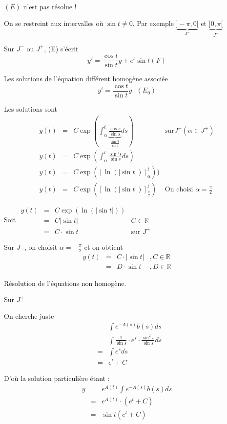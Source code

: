 $(E)$ n'est pas résolue !

On se restreint aux intervalles où $\sin t \neq 0$. Par exemple $\underbrace{]-\pi, 0[}_{J^-}$ et $\underbrace{]0, \pi[}_{J^+}$

Sur $J^-$ ou $J^+$, (E) s'écrit \[y' = \frac{\cos t}{\sin t}y + e^t \sin t (F)\]

Les solutions de l'équation différent homogène associée \[y' = \frac{\cos t}{\sin t} y \text{ } (E_0)\]

Les solutions sont \[\begin{array}{rclr}
y(t) &=& C \exp(\int^t_\alpha \underbrace{\frac{\cos s}{\sin s}}_{\frac{\sin't}{\sin t}}ds) &\text{sur} J^+ (\alpha \in J^+) \\
y(t) &=& C \exp(\int^t_\alpha \frac{\sin's}{\sin s}ds) \\ 
y(t) &=& C \exp([\ln(|\sin t|)]^t_\alpha)) \\ 
y(t) &=& C \exp([\ln(|\sin t|)]^t_{\frac{\pi}{2}}) & \text{On choisi } \alpha = \frac{\pi}{2}
\end{array}\]

Soit $\begin{array}{rclr}y(t) &=& C\exp(\ln(|\sin t|)) \\
&=& C|\sin t| & C \in \mathbb{R}\\
&=& C\cdot \sin t & \text{sur } J^+\end{array}$

Sur $J^-$, on choisit $\alpha = -\frac{\pi}{2}$ et on obtient \[\begin{array}{rclr}
y(t) &=& C\cdot |\sin t|&, C \in \mathbb{R} \\
&=& D \cdot \sin t&, D \in \mathbb{R}\end{array}\]

Résolution de l'équations non homogène.

Sur $J^+$

On cherche juste \[\begin{array}{rcl}
&&\int e^{-A(s)}b(s)ds \\
&=& \int \frac{1}{\sin s} \cdot e^s \cdot \frac{\sin^2 s}{\sin s} ds \\
&=& \int e^s ds \\
&=& e^t + C\end{array}\]

D'où la solution particulière étant :
\[\begin{array}{rcl}
y &=& e^{A(t)}\int e^{-A(s)}b(s) ds \\
&=& e^{A(t)}\cdot(e^t + C) \\
&=& \sin t (e^t + C)\end{array}\]

